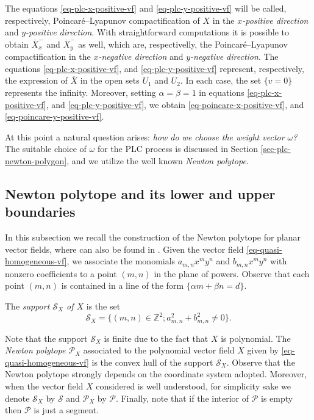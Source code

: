 \documentclass[12pt]{amsart}
\begin{document}
The equations \eqref{eq-plc-x-positive-vf} and \eqref{eq-plc-y-positive-vf} will be called, respectively, Poincaré--Lyapunov compactification of $X$ in the \emph{$x$-positive direction} and \emph{$y$-positive direction}. With straightforward computations it is possible to obtain $\overline{X}^{-}_{x}$ and $\overline{X}^{-}_{y}$ as well, which are, respectivelly, the Poincaré--Lyapunov compactification in the \emph{$x$-negative direction} and \emph{$y$-negative direction}. The equations \eqref{eq-plc-x-positive-vf}, and \eqref{eq-plc-y-positive-vf} represent, respectively, the expression of $\overline{X}$ in the open sets $U_{1}$ and $U_{2}$. In each case, the set $\{v = 0\}$ represents the infinity. Moreover, setting $\alpha = \beta = 1$ in equations \eqref{eq-plc-x-positive-vf}, and \eqref{eq-plc-y-positive-vf}, we obtain \eqref{eq-poincare-x-positive-vf}, and \eqref{eq-poincare-y-positive-vf}.

At this point a natural question arises: \emph{how do we choose the weight vector $\omega$?} The suitable choice of $\omega$ for the PLC process is discussed in Section \ref{sec-plc-newton-polygon}, and we utilize the well known \emph{Newton polytope}.

\subsection{Newton polytope and its lower and upper boundaries}\label{subsec-newton-polytope}

In this subsection we recall the construction of the Newton polytope for planar vector fields, where can also be found in \cite{Berezovskaya2, Kappos}. Given the vector field \eqref{eq-quasi-homogeneous-vf}, we associate the monomials $a_{m,n}x^{m}y^{n}$ and $b_{m,n}x^{m}y^{n}$ with nonzero coefficients to a point $(m,n)$ in the plane of powers. Observe that each point $(m,n)$ is contained in a line of the form $\{\alpha m + \beta n = d\}$.

The \emph{support $\mathcal{S}_{X}$ of $X$} is the set
$$\mathcal{S}_{X} = \{(m,n)\in \mathbb{Z}^{2}; a_{m,n}^{2} + b_{m,n}^{2} \neq 0\}.$$

Note that the support $\mathcal{S}_{X}$ is finite due to the fact that $X$ is polynomial. The \emph{Newton polytope $\mathcal{P}_{X}$} associated to the polynomial vector field $X$ given by \eqref{eq-quasi-homogeneous-vf} is the convex hull of the support $\mathcal{S}_{X}$. Observe that the Newton polytope strongly depends on the coordinate system adopted. Moreover, when the vector field $X$ considered is well understood, for simplicity sake we denote $\mathcal{S}_{X}$ by $\mathcal{S}$ and $\mathcal{P}_{X}$ by $\mathcal{P}$. Finally, note that if the interior of $\mathcal{P}$ is empty then $\mathcal{P}$ is just a segment.
\end{document}
